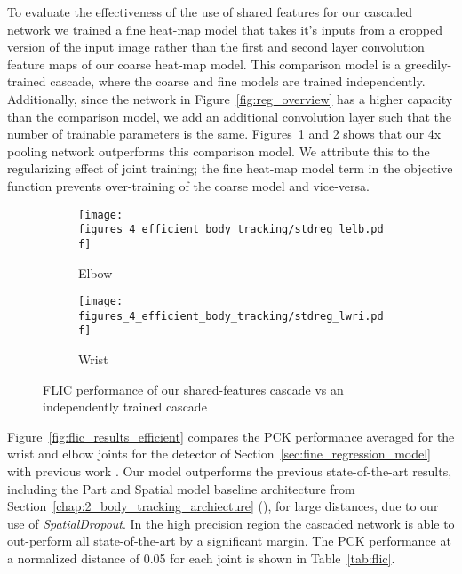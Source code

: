 To evaluate the effectiveness of the use of shared features for our cascaded network we trained a fine heat-map model that takes it's inputs from a cropped version of the input image rather than the first and second layer convolution feature maps of our coarse heat-map model. This comparison model is a greedily-trained cascade, where the coarse and fine models are trained independently. Additionally, since the network in Figure~\ref{fig:reg_overview} has a higher capacity than the comparison model, we add an additional convolution layer such that the number of trainable parameters is the same. Figures~\ref{fig:stdreg_lelb} and \ref{fig:stdreg_lwri} shows that our 4x pooling network outperforms this comparison model. We attribute this to the regularizing effect of joint training; the fine heat-map model term in the objective function prevents over-training of the coarse model and vice-versa.

\begin{figure}[ht]
  \centering
  \begin{subfigure}[b]{0.49\linewidth}
        \texttt{[image: figures\_4\_efficient\_body\_tracking/stdreg\_lelb.pdf]}
        \caption{Elbow}
        \label{fig:stdreg_lelb}
  \end{subfigure}
  \begin{subfigure}[b]{0.49\linewidth}
        \texttt{[image: figures\_4\_efficient\_body\_tracking/stdreg\_lwri.pdf]}
        \caption{Wrist}
        \label{fig:stdreg_lwri}
  \end{subfigure}
  \caption{FLIC performance of our shared-features cascade vs an independently trained cascade}
  \label{fig:stdreg}
\end{figure}

Figure~\ref{fig:flic_results_efficient} compares the PCK performance averaged for the wrist and elbow joints for the detector of Section~\ref{sec:fine_regression_model} with previous work . Our model outperforms the previous state-of-the-art results, including the Part and Spatial model baseline architecture from Section~\ref{chap:2_body_tracking_archiecture} (\cite{tompsonnips2014}), for large distances, due to our use of \textit{SpatialDropout}. In the high precision region the cascaded network is able to out-perform all state-of-the-art by a significant margin. The PCK performance at a normalized distance of 0.05 for each joint is shown in Table~\ref{tab:flic}. 

